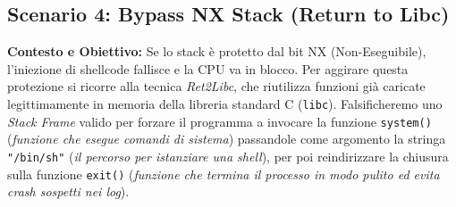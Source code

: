 \documentclass[12pt,a4paper]{report}
\begin{document}
	\subsection{Scenario 4: Bypass NX Stack (Return to Libc)}
	\textbf{Contesto e Obiettivo:} Se lo stack è protetto dal bit NX (Non-Eseguibile), l'iniezione di shellcode fallisce e la CPU va in blocco. Per aggirare questa protezione si ricorre alla tecnica \textit{Ret2Libc}, che riutilizza funzioni già caricate legittimamente in memoria della libreria standard C (\texttt{libc}). Falsificheremo uno \textit{Stack Frame} valido per forzare il programma a invocare la funzione \texttt{system()} (\textit{funzione che esegue comandi di sistema}) passandole come argomento la stringa \texttt{"/bin/sh"} (\textit{il percorso per istanziare una shell}), per poi reindirizzare la chiusura sulla funzione \texttt{exit()} (\textit{funzione che termina il processo in modo pulito ed evita crash sospetti nei log}).
	
\end{document}
